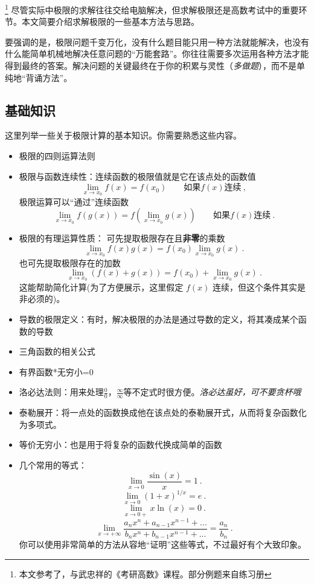 
\begin{issues}
\issueDraft
\end{issues}
\footnote{本文参考了\cite{同济高}，\cite{Thomas}与武忠祥的《考研高数》课程。部分例题来自练习册}
尽管实际中极限的求解往往交给电脑解决，但求解极限还是高数考试中的重要环节。本文简要介绍求解极限的一些基本方法与思路。

要强调的是，极限问题千变万化，没有什么题目能只用一种方法就能解决，也没有什么能简单机械地解决任意问题的“万能套路”。你往往需要多次运用各种方法才能得到最终的答案。解决问题的关键最终在于你的积累与灵性（\textsl{多做题}），而不是单纯地“背诵方法”。

\subsection{基础知识}
这里列举一些关于极限计算的基本知识。你需要熟悉这些内容。
\begin{itemize}
\item 极限的四则运算法则
\item 极限与函数连续性：连续函数的极限值就是它在该点处的函数值
$$
\lim_{x \to x_0} f(x) = f(x_0) \qquad \text{如果} f(x) \text{连续}~,
$$
极限运算可以“通过”连续函数
$$
\lim_{x \to x_0} f(g(x)) = f(\lim_{x \to x_0} g(x)) \qquad \text{如果} f(x) \text{连续}~.
$$
\item 极限的有理运算性质：
可先提取极限存在且\textbf{非零}的乘数 
$$\lim_{x\to x_0} f(x)g(x) = f(x_0)\lim_{x\to x_0} g(x)~.$$
也可先提取极限存在的加数
$$\lim_{x\to x_0} (f(x)+g(x)) = f(x_0)+\lim_{x\to x_0} g(x)~.$$
这能帮助简化计算(为了方便展示，这里假定 $f(x)$ 连续，但这个条件其实是非必须的)。
\item 导数的极限定义：有时，解决极限的办法是通过导数的定义，将其凑成某个函数的导数
\item 三角函数的相关公式
\item 有界函数*无穷小=0
\item 洛必达法则：用来处理$\frac{0}{0}$，$\frac{\infty}{\infty}$等不定式时很方便。\textsl{洛必达虽好，可不要贪杯哦}
\item 泰勒展开：将一点处的函数换成他在该点处的泰勒展开式，从而将复杂函数化为多项式。
\item 等价无穷小：也是用于将复杂的函数代换成简单的函数
\item 几个常用的等式：
$$\lim_{x\to0} \frac{\sin(x)}{x}=1~.$$
$$\lim_{x\to0} (1+x)^{1/x}=e~.$$
$$\lim_{x\to0+} x\ln(x)=0~.$$
$$\lim_{x\to+\infty} \frac{a_nx^n+a_{n-1}x^{n-1}+...}{b_nx^n+b_{n-1}x^{n-1}+...}=\frac{a_n}{b_n}~.$$
你可以使用非常简单的方法从容地“证明”这些等式，不过最好有个大致印象。
\end{itemize}


